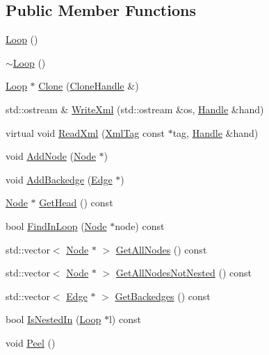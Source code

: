 \subsection*{Public Member Functions}
\begin{DoxyCompactItemize}
\item 
\hyperlink{classcfglib_1_1Loop_a14d3e2db416417b9a0debad435307fb6}{Loop} ()
\item 
\hyperlink{classcfglib_1_1Loop_a7ce83c4b6b9fca7d2c4c86dfce6f4197}{$\sim$\+Loop} ()
\item 
\hyperlink{classcfglib_1_1Loop}{Loop} $\ast$ \hyperlink{classcfglib_1_1Loop_a87d6a91d0a7c1174e0c2ce2a205cb41e}{Clone} (\hyperlink{classcfglib_1_1CloneHandle}{Clone\+Handle} \&)
\item 
std\+::ostream \& \hyperlink{classcfglib_1_1Loop_a66cf343ede5add1036351ffd35d85065}{Write\+Xml} (std\+::ostream \&os, \hyperlink{classcfglib_1_1Handle}{Handle} \&hand)
\item 
virtual void \hyperlink{classcfglib_1_1Loop_a9bca6f0b552a7863259d34611dff7b4a}{Read\+Xml} (\hyperlink{classXmlTag}{Xml\+Tag} const $\ast$tag, \hyperlink{classcfglib_1_1Handle}{Handle} \&hand)
\item 
void \hyperlink{classcfglib_1_1Loop_ae6c9f22b961258f08b3f5e75629d0b1e}{Add\+Node} (\hyperlink{classcfglib_1_1Node}{Node} $\ast$)
\item 
void \hyperlink{classcfglib_1_1Loop_a2d327d15a95feaa19e09b83a1cf6a496}{Add\+Backedge} (\hyperlink{classcfglib_1_1Edge}{Edge} $\ast$)
\item 
\hyperlink{classcfglib_1_1Node}{Node} $\ast$ \hyperlink{classcfglib_1_1Loop_ae6a56b136cd76001c559b80172da3e64}{Get\+Head} () const
\item 
bool \hyperlink{classcfglib_1_1Loop_acbe30a927df0b77ed4aed07cb1517ba4}{Find\+In\+Loop} (\hyperlink{classcfglib_1_1Node}{Node} $\ast$node) const
\item 
std\+::vector$<$ \hyperlink{classcfglib_1_1Node}{Node} $\ast$ $>$ \hyperlink{classcfglib_1_1Loop_a20282571d9b3cef7723049480d3898fb}{Get\+All\+Nodes} () const
\item 
std\+::vector$<$ \hyperlink{classcfglib_1_1Node}{Node} $\ast$ $>$ \hyperlink{classcfglib_1_1Loop_a9dbb2c3b99d8a5cb6a89f725ac5e46b3}{Get\+All\+Nodes\+Not\+Nested} () const
\item 
std\+::vector$<$ \hyperlink{classcfglib_1_1Edge}{Edge} $\ast$ $>$ \hyperlink{classcfglib_1_1Loop_ae7a81ef3af9e19ef9cf86e4d807e76eb}{Get\+Backedges} () const
\item 
bool \hyperlink{classcfglib_1_1Loop_a8deea5bb51a437e8417143e77ee435a7}{Is\+Nested\+In} (\hyperlink{classcfglib_1_1Loop}{Loop} $\ast$l) const
\item 
void \hyperlink{classcfglib_1_1Loop_a8df5fb64b7864ba46b405dd16385fb90}{Peel} ()
\end{DoxyCompactItemize}


